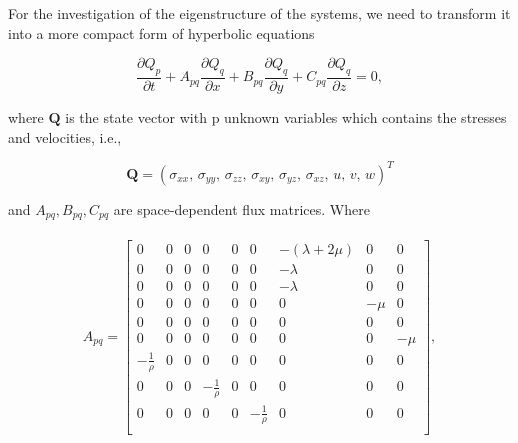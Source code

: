 For the investigation of the eigenstructure of the systems, we need to transform it into a more compact form of hyperbolic equations

\begin{equation}
    \frac{\partial Q_p}{\partial t} + A_{pq} \frac{\partial Q_q}{\partial x} + 
    B_{pq} \frac{\partial Q_q}{\partial y} + C_{pq} \frac{\partial Q_q}{\partial z} = 0,
    \label{eq:compactform}
\end{equation}

where $\mathbf{Q}$ is the state vector with p unknown variables which contains the stresses and velocities, i.e.,

\begin{equation}
    \mathbf{Q} = \left(\sigma_{xx}, \, \sigma_{yy}, \, \sigma_{zz}, \, \sigma_{xy}, \, \sigma_{yz}, \, \sigma_{xz}, \, u, \, v, \, w \right)^T
\end{equation}

and $A_{pq}, B_{pq}, C_{pq}$ are space-dependent flux matrices. Where

\begin{align}
    \begin{split}
    A_{pq} = 
        \begin{bmatrix}
        0 & 0 & 0 & 0 & 0 & 0 & -\left(\lambda + 2\mu\right) & 0 & 0 \\
        0 & 0 & 0 & 0 & 0 & 0 & -\lambda                     & 0 & 0 \\
        0 & 0 & 0 & 0 & 0 & 0 & -\lambda                     & 0 & 0 \\
        0 & 0 & 0 & 0 & 0 & 0 & 0                   & -\mu & 0 \\
        0 & 0 & 0 & 0 & 0 & 0 & 0                   & 0 & 0 \\
        0 & 0 & 0 & 0 & 0 & 0 & 0                   & 0 & -\mu \\
        -\frac{1}{\rho} & 0 & 0 & 0 & 0 & 0 & 0                   & 0 & 0 \\
        0 & 0 & 0 & -\frac{1}{\rho} & 0 & 0 & 0                   & 0 & 0 \\
        0 & 0 & 0 & 0 & 0 & -\frac{1}{\rho} & 0                   & 0 & 0 \\
    \end{bmatrix},
    \end{split}
    \label{eq:fluxmatrix}
\end{align}

